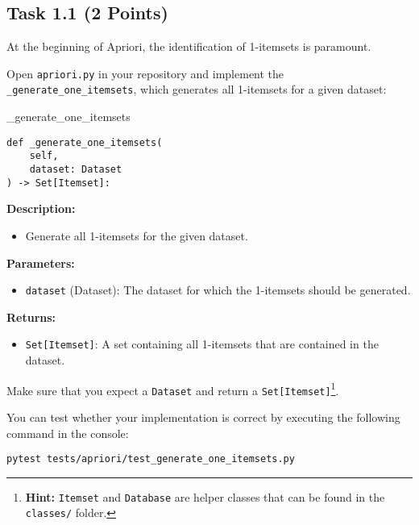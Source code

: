 \documentclass[
english,
smallborders
]{i6prcsht}
\newcommand{\points}[1]{\hfill \color{red}(#1 Points)\color{black}}
\begin{document}
\subsection*{Task 1.1 \points{2}}

At the beginning of Apriori, the identification of 1-itemsets is paramount.

Open \texttt{apriori.py} in your repository and implement the \texttt{\_generate\_one\_itemsets}, which generates all 1-itemsets for a given dataset:

\vspace*{0.3cm}

\begin{functionbox}{\_generate\_one\_itemsets}
	\begin{lstlisting}[numbers=none]
def _generate_one_itemsets(
    self, 
    dataset: Dataset
) -> Set[Itemset]:
\end{lstlisting}
	
	\textbf{Description:}
	\begin{itemize}[leftmargin=*,topsep=0pt]
		\item Generate all 1-itemsets for the given dataset.
	\end{itemize}
	
	\textbf{Parameters:}
	\begin{itemize}[leftmargin=*,topsep=0pt]
		\item \texttt{dataset} (Dataset): The dataset for which the 1-itemsets should be generated.
	\end{itemize}
	
	\textbf{Returns:}
	\begin{itemize}[leftmargin=*,topsep=0pt]
		\item \texttt{Set[Itemset]}: A set containing all 1-itemsets that are contained in the dataset.
	\end{itemize}
\end{functionbox}

\vspace*{0.5cm}

Make sure that you expect a \texttt{Dataset} and return a \texttt{Set[Itemset]}\footnote{\textbf{Hint:} \texttt{Itemset} and \texttt{Database} are helper classes that can be found in the \texttt{classes/} folder.}.

You can test whether your implementation is correct by executing the following command in the console:

\vspace*{0.3cm}

\begin{lstlisting}
pytest tests/apriori/test_generate_one_itemsets.py
\end{lstlisting}
\end{document}
